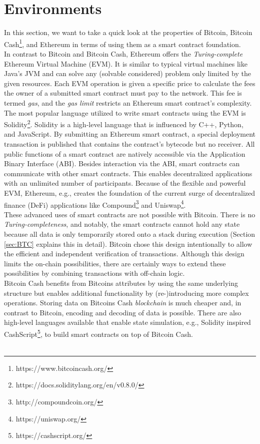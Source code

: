 \documentclass{cacthesis}
\begin{document}
        \section{Environments}
        \label{sec:smartContractOptions}
        In this section, we want to take a quick look at the properties of Bitcoin, Bitcoin Cash\footnote{https://www.bitcoincash.org/}, and Ethereum in terms of using them as a smart contract foundation. \\
        In contrast to Bitcoin and Bitcoin Cash, Ethereum offers the \textit{Turing-complete} Ethereum Virtual Machine (EVM). It is similar to typical virtual machines like Java's JVM and can solve any (solvable considered) problem only limited by the given resources. Each EVM operation is given a specific price to calculate the fees the owner of a submitted smart contract must pay to the network. This fee is termed \textit{gas}, and the \textit{gas limit} restricts an Ethereum smart contract's complexity. The most popular language utilized to write smart contracts using the EVM is Solidity\footnote{https://docs.soliditylang.org/en/v0.8.0/}. Solidity is a high-level language that is influenced by C++, Python, and JavaScript. By submitting an Ethereum smart contract, a special deployment transaction is published that contains the contract's bytecode but no receiver. All public functions of a smart contract are natively accessible via the Application Binary Interface (ABI). Besides interaction via the ABI, smart contracts can communicate with other smart contracts. This enables decentralized applications with an unlimited number of participants. Because of the flexible and powerful EVM, Ethereum, e.g., creates the foundation of the current surge of decentralized finance (DeFi) applications like Compound\footnote{http://compoundcoin.org/} and Uniswap\footnote{https://uniswap.org/}. \\
        These advanced uses of smart contracts are not possible with Bitcoin. There is no \textit{Turing-completeness}, and notably, the smart contracts cannot hold any state because all data is only temporarily stored onto a stack during execution (Section \ref{sec:BTC} explains this in detail). Bitcoin chose this design intentionally to allow the efficient and independent verification of transactions. Although this design limits the on-chain possibilities, there are certainly ways to extend these possibilities by combining transactions with off-chain logic. \\
        Bitcoin Cash benefits from Bitcoins attributes by using the same underlying structure but enables additional functionality by (re-)introducing more complex operations. Storing data on Bitcoins Cash \textit{blockchain} is much cheaper and, in contrast to Bitcoin, encoding and decoding of data is possible. There are also high-level languages available that enable state simulation, e.g., Solidity inspired CashScript\footnote{https://cashscript.org/}, to build smart contracts on top of Bitcoin Cash. \\\\
\end{document}
